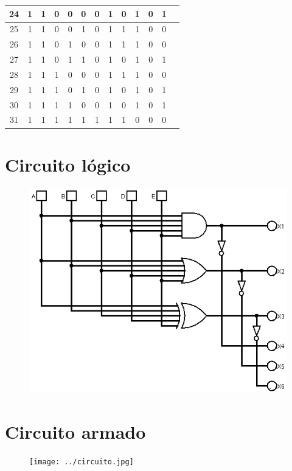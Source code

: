 \documentclass[11pt]{article}
\begin{document}
\begin{table}[H]
\begin{tabular}{|c|c|c|c|c|c|c|c|c|c|c|c|c|}
24 & 1 & 1 & 0 & 0 & 0 & 0 & 1 & 0 & 1 & 0 & 1 \\ \hline
25 & 1 & 1 & 0 & 0 & 1 & 0 & 1 & 1 & 1 & 0 & 0 \\ \hline
26 & 1 & 1 & 0 & 1 & 0 & 0 & 1 & 1 & 1 & 0 & 0 \\ \hline
27 & 1 & 1 & 0 & 1 & 1 & 0 & 1 & 0 & 1 & 0 & 1 \\ \hline
28 & 1 & 1 & 1 & 0 & 0 & 0 & 1 & 1 & 1 & 0 & 0 \\ \hline
29 & 1 & 1 & 1 & 0 & 1 & 0 & 1 & 0 & 1 & 0 & 1 \\ \hline
30 & 1 & 1 & 1 & 1 & 0 & 0 & 1 & 0 & 1 & 0 & 1 \\ \hline
31 & 1 & 1 & 1 & 1 & 1 & 1 & 1 & 1 & 0 & 0 & 0 \\ \hline
	    \end{tabular}
	\end{table}
	
	\section{Circuito lógico}
	\begin{figure}[H]
		\centering
		\includegraphics[scale=0.9]{logico.png}
	\end{figure}
	
	\section{Circuito armado}
	\begin{figure}[H]
		\centering
		\texttt{[image: ../circuito.jpg]}
	\end{figure}
	
\end{document}
